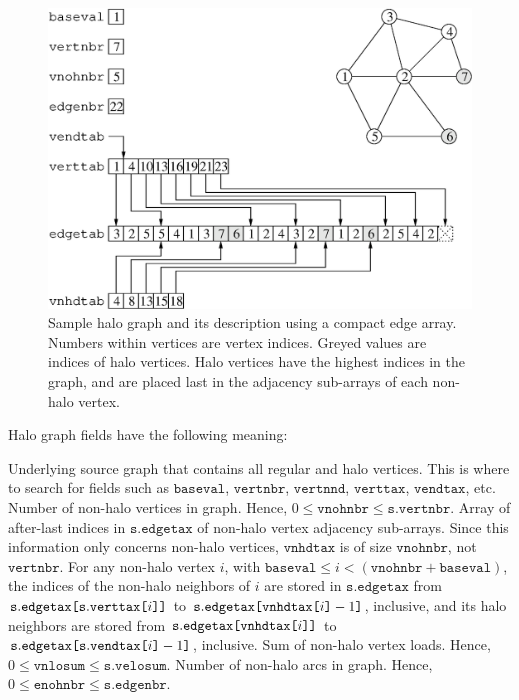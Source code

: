 \begin{figure}
\centering\includegraphics[scale=0.47]{m_f_gr3.eps}
\caption{Sample halo graph and its description using a compact edge
array. Numbers within vertices are vertex indices. Greyed values
are indices of halo vertices. Halo vertices have the highest indices
in the graph, and are placed last in the adjacency sub-arrays of each
non-halo vertex.}
\label{fig-lib-hgraf-one}
\end{figure}

Halo graph fields have the following meaning:
\begin{itemize}
\iteme[\texttt{s}]
Underlying source graph that contains all regular and halo
vertices. This is where to search for fields such as
$\mathtt{baseval}$, $\mathtt{vertnbr}$, $\mathtt{vertnnd}$,
$\mathtt{verttax}$, $\mathtt{vendtax}$, etc.
Number of non-halo vertices in graph. Hence, $0 \leq \mathtt{vnohnbr}
\leq \mathtt{s.vertnbr}$.
Array of after-last indices in $\mathtt{s.edgetax}$ of non-halo vertex
adjacency sub-arrays. Since this information only concerns non-halo
vertices, $\mathtt{vnhdtax}$ is of size $\mathtt{vnohnbr}$, not
$\mathtt{vertnbr}$.
For any non-halo vertex $i$, with $\mathtt{baseval} \leq i <
(\mathtt{vnohnbr} + \mathtt{baseval})$, the indices of the non-halo
neighbors of $i$ are stored in $\mathtt{s.edgetax}$ from $\mathtt{s.edgetax}\lbt
\mbox{\texttt{[}}\mathtt{s.verttax}\mbox{\texttt{[}}i\mbox{\texttt{]]}}$
to $\mathtt{s.edgetax}\lbt
\mbox{\texttt{[}}\mathtt{vnhdtax}\mbox{\texttt{[}}i\mbox{\texttt{]}} -
1\mbox{\texttt{]}}$, inclusive, and its halo neighbors are stored from
$\mathtt{s.edgetax}\lbt
\mbox{\texttt{[}}\mathtt{vnhdtax}\mbox{\texttt{[}}i\mbox{\texttt{]]}}$
to $\mathtt{s.edgetax}\lbt
\mbox{\texttt{[}}\mathtt{s.vendtax}\mbox{\texttt{[}}i\mbox{\texttt{]}} -
1\mbox{\texttt{]}}$, inclusive.
Sum of non-halo vertex loads. Hence, $0 \leq \mathtt{vnlosum}
\leq \mathtt{s.velosum}$.
Number of non-halo arcs in graph. Hence, $0 \leq \mathtt{enohnbr}
\leq \mathtt{s.edgenbr}$.
\end{itemize}

